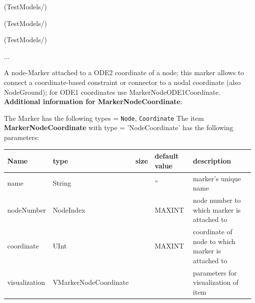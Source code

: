 \item {} (TestModels/)
\item {} (TestModels/)
\item {} (TestModels/)
\item  ...

\ei

%
\newpage

\label{sec:item:MarkerNodeCoordinate}
A node-Marker attached to a ODE2 coordinate of a node; this marker allows to connect a coordinate-based constraint or connector to a nodal coordinate (also NodeGround); for ODE1 coordinates use MarkerNodeODE1Coordinate.\vspace{12pt}
 \\{\bf Additional information for MarkerNodeCoordinate}:
\bi
  \item The Marker has the following types = \texttt{Node}, \texttt{Coordinate}
\ei
\vspace{12pt} \noindent The item {\bf MarkerNodeCoordinate} with type = 'NodeCoordinate' has the following parameters:\vspace{-1cm}\\ 
\begin{center}
  \footnotesize
  \begin{longtable}{| p{4.5cm} | p{2.5cm} | p{0.5cm} | p{2.5cm} | p{6cm} |}
    \hline
    \bf Name & \bf type & \bf size & \bf default value & \bf description \\ \hline
    name &     String &      &     '' &     marker's unique name\\ \hline
    nodeNumber &     NodeIndex &      &     MAXINT &     node number to which marker is attached to\\ \hline
    coordinate &     UInt &      &     MAXINT &     coordinate of node to which marker is attached to\\ \hline
    visualization & VMarkerNodeCoordinate & & & parameters for visualization of item \\ \hline
	  \end{longtable}
	\end{center}
